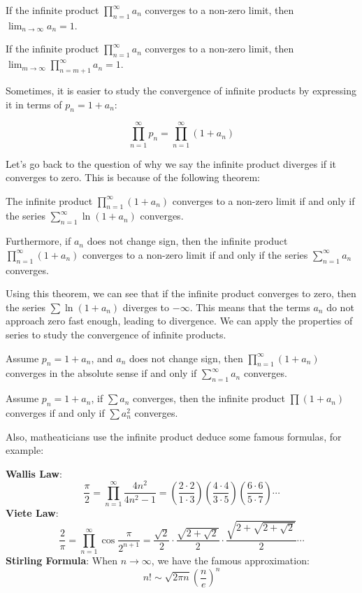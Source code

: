 \documentclass[oneside]{book}
\begin{document}
\begin{theorem}
    If the infinite product $\prod_{n=1}^{\infty} a_n$ converges to a non-zero limit, then $\lim_{n \to \infty} a_n = 1$.
    
    If the infinite product $\prod_{n=1}^{\infty} a_n$ converges to a non-zero limit, then $\lim_{m \to \infty} \prod_{n=m+1}^{\infty} a_n = 1$.
\end{theorem}

Sometimes, it is easier to study the convergence of infinite products by expressing it in terms of $p_n = 1 + a_n$:

\[
\prod_{n=1}^{\infty} p_n = \prod_{n=1}^{\infty} (1 + a_n)
\]

Let's go back to the question of why we say the infinite product diverges if it converges to zero. This is because of the following theorem:

\begin{theorem}
    The infinite product $\prod_{n=1}^{\infty} (1 + a_n)$ converges to a non-zero limit if and only if the series $\sum_{n=1}^{\infty} \ln(1 + a_n)$ converges.
    
    Furthermore, if $a_n$ does not change sign, then the infinite product $\prod_{n=1}^{\infty} (1 + a_n)$ converges to a non-zero limit if and only if the series $\sum_{n=1}^{\infty} a_n$ converges.
\end{theorem}

Using this theorem, we can see that if the infinite product converges to zero, then the series $\sum \ln(1 + a_n)$ diverges to $-\infty$. This means that the terms $a_n$ do not approach zero fast enough, leading to divergence. We can apply the properties of series to study the convergence of infinite products.

\begin{corollary}
    Assume $p_n = 1 + a_n$, and $a_n$ does not change sign, then $\prod_{n=1}^{\infty} (1+a_n)$ converges in the absolute sense if and only if $\sum_{n=1}^{\infty} a_n$ converges.
\end{corollary}

\begin{corollary}
    Assume $p_n = 1 + a_n$, if $\sum a_n$ converges, then the infinite product $\prod (1+a_n)$ converges if and only if $\sum a_n^2$ converges.
\end{corollary}

Also, matheaticians use the infinite product deduce some famous formulas, for example:

\textbf{Wallis Law}:
\[\frac{\pi}{2} = \prod_{n=1}^{\infty} \frac{4n^2}{4n^2 - 1} = \left(\frac{2 \cdot 2}{1 \cdot 3}\right) \left(\frac{4 \cdot 4}{3 \cdot 5}\right) \left(\frac{6 \cdot 6}{5 \cdot 7}\right) \cdots\]
\textbf{Viete Law}:
\[\frac{2}{\pi} = \prod_{n=1}^{\infty} \cos \frac{\pi}{2^{n+1}} = \frac{\sqrt{2}}{2} \cdot \frac{\sqrt{2 + \sqrt{2}}}{2} \cdot \frac{\sqrt{2 + \sqrt{2 + \sqrt{2}}}}{2} \cdots\]
\textbf{Stirling Formula}:
When $n \to \infty$, we have the famous approximation:
\[n! \sim \sqrt{2\pi n}\left(\frac{n}{e}\right)^n\]
\end{document}
